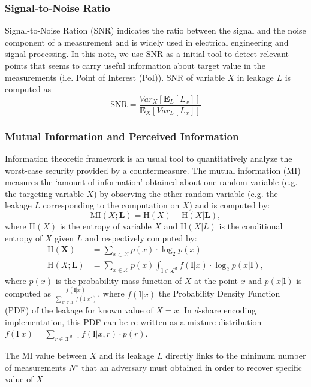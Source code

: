 \documentclass{llncs}
\begin{document}
\subsubsection*{Signal-to-Noise Ratio}
Signal-to-Noise Ration (SNR) indicates the ratio between the signal and the noise component of a measurement and is widely used in electrical engineering and signal processing. In this note, we use SNR as a initial tool to detect relevant points that seems to carry useful information about target value in the measurements (i.e. Point of Interest (PoI)).
SNR of variable $X$ in leakage $L$ is computed as
\begin{equation*}
	\text{SNR} = \frac{Var_{X}[\mathbf{E}_L[L_x]]}{\mathbf{E}_{X}[Var_L[L_x]]}
\end{equation*}
\subsubsection*{Mutual Information and Perceived Information}
\medspace
Information theoretic framework  is an usual tool to quantitatively analyze the worst-case security provided by a countermeasure. The mutual information (MI) measures the `amount of information'  obtained about one random variable (e.g. the targeting variable $X$) by observing the other random variable (e.g. the leakage $L$ corresponding to the computation on $X$) and is computed by:
\begin{equation}
	\text{MI}(X; \mathbf{L})  = \text{H}(X) - \text{H}(X|\mathbf{L}),
\end{equation}
where $\text{H}(X)$ is the entropy of variable $X$ and $\text{H}(X|L)$ is the conditional entropy of $X$ given $L$ and respectively computed by:
\begin{align}
	\text{H}(\bm{X}) &= \sum_{x\in \mathcal{X}} p(x)\cdot \log_2 p(x)\\
	\text{H}(X;\bm{L}) &= \sum_{x \in \mathcal{X}} p(x)\int_{\bm{l}\in \mathcal{L}^d}f(\bm{l}|x)\cdot \log_2 p(x|\bm{l}),
\end{align}
where $p(x)$ is the probability mass function of $X$ at the point $x$ and $p(x|\bm{l})$ is computed as $\frac{f(\bm{l}|x)}{\sum_{x'\in \mathcal{X}}f(\bm{l}|x')}$, where $f(\bm{l}|x)$ the Probability Density Function (PDF) of the leakage for known value of $X=x$. In $d$-share encoding implementation, this PDF can be re-written as a mixture distribution $f(\bm{l}|x) = \sum_{r\in \mathcal{X}^{d-1}}f(\bm{l}|x, r)\cdot p(r)$.

The MI value between $X$ and its leakage $L$ directly links to the minimum number of measurements $N^{\star}$ that an adversary must obtained in order to recover specific value of $X$ 
\end{document}
